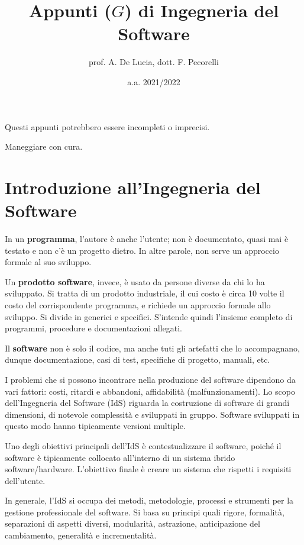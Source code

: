 \documentclass{article}
\title{Appunti ($G$) di Ingegneria del Software}
\author{prof. A. De Lucia, dott. F. Pecorelli}
\date{a.a. 2021/2022}
\begin{document}
\maketitle

\begin{center}
    Questi appunti potrebbero essere incompleti o imprecisi.
    
    Maneggiare con cura.
\end{center}

\tableofcontents

\section{Introduzione all'Ingegneria del Software}

    In un \textbf{programma}, l’autore è anche l’utente; non è documentato, quasi mai è testato e non c’è un progetto dietro. In altre parole, non serve un approccio formale al suo sviluppo.
    
    Un \textbf{prodotto software}, invece, è usato da persone diverse da chi lo ha sviluppato. Si tratta di un prodotto industriale, il cui costo è circa 10 volte il costo del corrispondente programma, e richiede un approccio formale allo sviluppo. Si divide in generici e specifici. S’intende quindi l’insieme completo di programmi, procedure e documentazioni allegati.
    
    Il \textbf{software} non è solo il codice, ma anche tuti gli artefatti che lo accompagnano, dunque documentazione, casi di test, specifiche di progetto, manuali, etc.
    
    \vspace{3mm}
    
    I problemi che si possono incontrare nella produzione del software dipendono da vari fattori: costi, ritardi e abbandoni, affidabilità (malfunzionamenti). Lo scopo dell’Ingegneria del Software (IdS) riguarda la costruzione di software di grandi dimensioni, di notevole complessità e sviluppati in gruppo. Software sviluppati in questo modo hanno tipicamente versioni multiple. 
    
    Uno degli obiettivi principali dell’IdS è contestualizzare il software, poiché il software è tipicamente collocato all’interno di un sistema ibrido software/hardware. L’obiettivo finale è creare un sistema che rispetti i requisiti dell’utente. 
    
    \vspace{3mm}
    
    In generale, l’IdS si occupa dei metodi, metodologie, processi e strumenti per la gestione professionale del software. Si basa su principi quali rigore, formalità, separazioni di aspetti diversi, modularità, astrazione, anticipazione del cambiamento, generalità e incrementalità.
    
\end{document}

